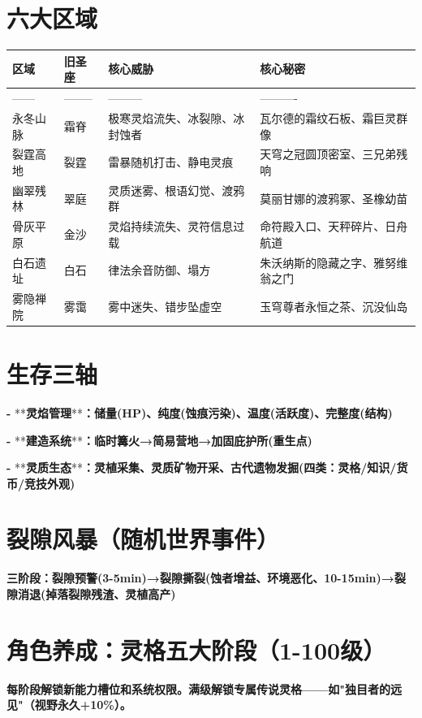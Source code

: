 \documentclass[12pt,a4paper,openany]{ctexbook}
\begin{document}
\section*{六大区域}


\begin{tabular}{|l|l|l|l|}
\hline
区域 & 旧圣座 & 核心威胁 & 核心秘密 \\
\hline
------ & -------- & --------- & ---------- \\
永冬山脉 & 霜脊 & 极寒灵焰流失、冰裂隙、冰封蚀者 & 瓦尔德的霜纹石板、霜巨灵群像 \\
裂霆高地 & 裂霆 & 雷暴随机打击、静电灵痕 & 天穹之冠圆顶密室、三兄弟残响 \\
幽翠残林 & 翠庭 & 灵质迷雾、根语幻觉、渡鸦群 & 莫丽甘娜的渡鸦冢、圣橡幼苗 \\
骨灰平原 & 金沙 & 灵焰持续流失、灵符信息过载 & 命符殿入口、天秤碎片、日舟航道 \\
白石遗址 & 白石 & 律法余音防御、塌方 & 朱沃纳斯的隐藏之字、雅努维翁之门 \\
雾隐禅院 & 雾霭 & 雾中迷失、错步坠虚空 & 玉穹尊者永恒之茶、沉没仙岛 \\
\hline
\end{tabular}


\section*{生存三轴}


\textbf{- }**\textbf{灵焰管理}**\textbf{：储量(HP)、纯度(蚀痕污染)、温度(活跃度)、完整度(结构)}

\textbf{- }**\textbf{建造系统}**\textbf{：临时篝火→简易营地→加固庇护所(重生点)}

\textbf{- }**\textbf{灵质生态}**\textbf{：灵植采集、灵质矿物开采、古代遗物发掘(四类：灵格/知识/货币/竞技外观)}


\section*{裂隙风暴（随机世界事件）}


\textbf{三阶段：裂隙预警(3-5min)→裂隙撕裂(蚀者增益、环境恶化、10-15min)→裂隙消退(掉落裂隙残渣、灵植高产)}


\section*{角色养成：灵格五大阶段（1-100级）}


\textbf{每阶段解锁新能力槽位和系统权限。满级解锁专属传说灵格——如"独目者的远见"（视野永久+10\%）。}
\end{document}
